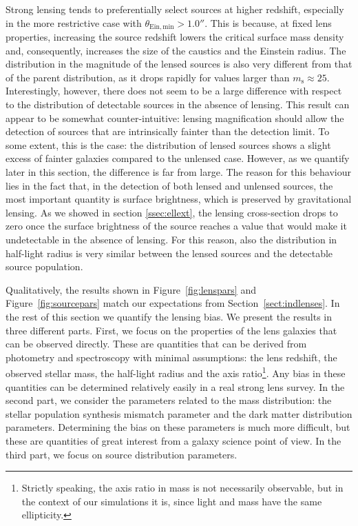 \documentclass{aa}
\def\msource{m_{\mathrm{s}}}
\def\Sref#1{Section~\ref{#1}\xspace}
\def\Fref#1{Figure~\ref{#1}\xspace}
\begin{document}
Strong lensing tends to preferentially select sources at higher redshift, especially in the more restrictive case with $\theta_{\mathrm{Ein,min}} > 1.0''$.
This is because, at fixed lens properties, increasing the source redshift lowers the critical surface mass density and, consequently, increases the size of the caustics and the Einstein radius.
The distribution in the magnitude of the lensed sources is also very different from that of the parent distribution, as it drops rapidly for values larger than $\msource\approx25$.
Interestingly, however, there does not seem to be a large difference with respect to the distribution of detectable sources in the absence of lensing.
This result can appear to be somewhat counter-intuitive: lensing magnification should allow the detection of sources that are intrinsically fainter than the detection limit. To some extent, this is the case: the distribution of lensed sources shows a slight excess of fainter galaxies compared to the unlensed case. However, as we quantify later in this section, the difference is far from large.
The reason for this behaviour lies in the fact that, in the detection of both lensed and unlensed sources, the most important quantity is surface brightness, which is preserved by gravitational lensing.
As we showed in section \ref{ssec:ellext}, the lensing cross-section drops to zero once the surface brightness of the source reaches a value that would make it undetectable in the absence of lensing.
For this reason, also the distribution in half-light radius is very similar between the lensed sources and the detectable source population.

Qualitatively, the results shown in \Fref{fig:lenspars} and \Fref{fig:sourcepars} match our expectations from \Sref{sect:indlenses}.
In the rest of this section we quantify the lensing bias.
We present the results in three different parts.
First, we focus on the properties of the lens galaxies that can be observed directly. These are quantities that can be derived from photometry and spectroscopy with minimal assumptions: the lens redshift, the observed stellar mass, the half-light radius and the axis ratio\footnote{Strictly speaking, the axis ratio in mass is not necessarily observable, but in the context of our simulations it is, since light and mass have the same ellipticity.}.
Any bias in these quantities can be determined relatively easily in a real strong lens survey.
In the second part, we consider the parameters related to the mass distribution: the stellar population synthesis mismatch parameter and the dark matter distribution parameters. Determining the bias on these parameters is much more difficult, but these are quantities of great interest from a galaxy science point of view.
In the third part, we focus on source distribution parameters. 
\end{document}
